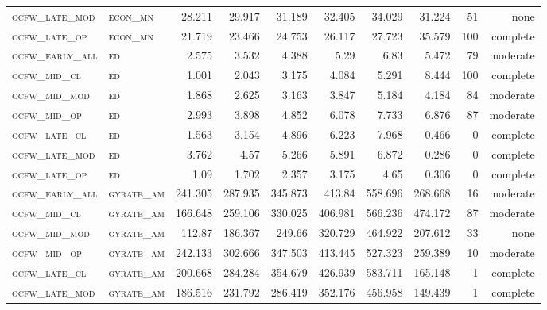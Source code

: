 \begin{landscape}
\begin{center}
\begin{footnotesize}
\begin{longtable}{llrrrrr|rrr}
\textsc{ocfw\_late\_mod } & \textsc{econ\_mn  }    & 28.211   & 29.917   & 31.189   & 32.405   & 34.029   & 31.224   & 51  & none     \\
\textsc{ocfw\_late\_op  } & \textsc{econ\_mn  }    & 21.719   & 23.466   & 24.753   & 26.117   & 27.723   & 35.579   & 100 & complete \\
\textsc{ocfw\_early\_all} & \textsc{ed        }    & 2.575    & 3.532    & 4.388    & 5.29     & 6.83     & 5.472    & 79  & moderate \\
\textsc{ocfw\_mid\_cl   } & \textsc{ed        }    & 1.001    & 2.043    & 3.175    & 4.084    & 5.291    & 8.444    & 100 & complete \\
\textsc{ocfw\_mid\_mod  } & \textsc{ed        }    & 1.868    & 2.625    & 3.163    & 3.847    & 5.184    & 4.184    & 84  & moderate \\
\textsc{ocfw\_mid\_op   } & \textsc{ed        }    & 2.993    & 3.898    & 4.852    & 6.078    & 7.733    & 6.876    & 87  & moderate \\
\textsc{ocfw\_late\_cl  } & \textsc{ed        }    & 1.563    & 3.154    & 4.896    & 6.223    & 7.968    & 0.466    & 0   & complete \\
\textsc{ocfw\_late\_mod } & \textsc{ed        }    & 3.762    & 4.57     & 5.266    & 5.891    & 6.872    & 0.286    & 0   & complete \\
\textsc{ocfw\_late\_op  } & \textsc{ed        }    & 1.09     & 1.702    & 2.357    & 3.175    & 4.65     & 0.306    & 0   & complete \\
\textsc{ocfw\_early\_all} & \textsc{gyrate\_am}    & 241.305  & 287.935  & 345.873  & 413.84   & 558.696  & 268.668  & 16  & moderate \\
\textsc{ocfw\_mid\_cl   } & \textsc{gyrate\_am}    & 166.648  & 259.106  & 330.025  & 406.981  & 566.236  & 474.172  & 87  & moderate \\
\textsc{ocfw\_mid\_mod  } & \textsc{gyrate\_am}    & 112.87   & 186.367  & 249.66   & 320.729  & 464.922  & 207.612  & 33  & none     \\
\textsc{ocfw\_mid\_op   } & \textsc{gyrate\_am}    & 242.133  & 302.666  & 347.503  & 413.445  & 527.323  & 259.389  & 10  & moderate \\
\textsc{ocfw\_late\_cl  } & \textsc{gyrate\_am}    & 200.668  & 284.284  & 354.679  & 426.939  & 583.711  & 165.148  & 1   & complete \\
\textsc{ocfw\_late\_mod } & \textsc{gyrate\_am}    & 186.516  & 231.792  & 286.419  & 352.176  & 456.958  & 149.439  & 1   & complete \\

\end{longtable}
\end{footnotesize}
\end{center}
\end{landscape}
